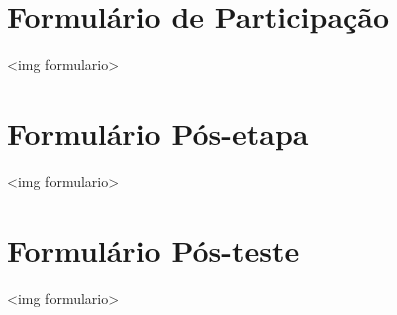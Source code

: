 \documentclass[cic,tc]{iiufrgs}
\begin{document}



\appendix
\chapter{Formulário de Participação}
\label{appendFormPortal}
<img formulario>

\chapter{Formulário Pós-etapa}
\label{appendFormStepPortal}
<img formulario>

\chapter{Formulário Pós-teste}
\label{appendFormFinalPortal}
<img formulario>
\end{document}
